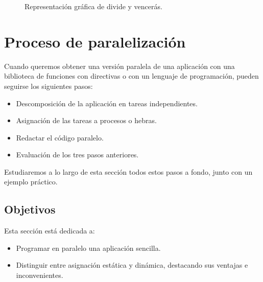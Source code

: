 \begin{figure}[H]
\centering
{}
\caption{Representación gráfica de divide y vencerás.}
\label{graph:dyv}
\end{figure}


\newpage
\section{Proceso de paralelización}
Cuando queremos obtener una versión paralela de una aplicación con una biblioteca de funciones con directivas o con un lenguaje de programación, pueden seguirse los siguientes pasos:
\begin{itemize}
    \item Descomposición de la aplicación en tareas independientes.
    \item Asignación de las tareas a procesos o hebras. 
    \item Redactar el código paralelo. 
    \item Evaluación de los tres pasos anteriores.
\end{itemize}
Estudiaremos a lo largo de esta sección todos estos pasos a fondo, junto con un ejemplo práctico.

\subsection{Objetivos}
Esta sección está dedicada a:
\begin{itemize}
    \item Programar en paralelo una aplicación sencilla.
    \item Distinguir entre asignación estática y dinámica, destacando sus ventajas e inconvenientes.
\end{itemize}

